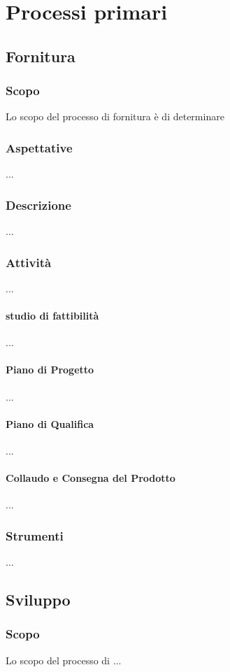 \section{Processi primari}
\subsection{Fornitura}
    \subsubsection{Scopo}
        Lo scopo del processo di fornitura è di determinare
    \subsubsection{Aspettative}
        ...
    \subsubsection{Descrizione}
        ...
    \subsubsection{Attività}
        ...
        \paragraph{studio di fattibilità}
            ...
        \paragraph{Piano di Progetto}
            ...
        \paragraph{Piano di Qualifica}
            ...
        \paragraph{Collaudo e Consegna del Prodotto}
            ...
    \subsubsection{Strumenti}
        ...

\subsection{Sviluppo}
    \subsubsection{Scopo}
        Lo scopo del processo di ...
